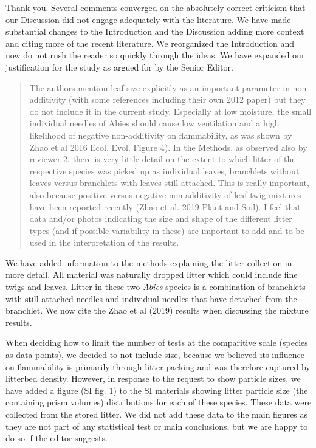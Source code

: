 \documentclass[letterpaper, 12pt]{letter}
\begin{document}
\begin{letter}{}
Thank you. Several comments converged on the absolutely correct criticism that our Discussion did not engage adequately with the literature. We have made substantial changes to the Introduction and the Discussion adding more context and citing more of the recent literature. We reorganized the Introduction and now do not rush the reader so quickly through the ideas. We have expanded our justification for the study as argued for by the Senior Editor.


\begin{quote}
The authors mention leaf size explicitly as an important parameter in non-additivity (with some references including their own 2012 paper) but they do not include it in the current study. Especially at low moisture, the small individual needles of Abies should cause low ventilation and a high likelihood of negative non-additivity on flammability, as was shown by Zhao et al 2016 Ecol. Evol. Figure 4). In the Methods, as observed also by reviewer 2, there is very little detail on the extent to which litter of the respective species was picked up as individual leaves, branchlets without leaves versus branchlets with leaves still attached. This is really important, also because positive versus negative non-additivity of leaf-twig mixtures have been reported recently (Zhao et al. 2019 Plant and Soil). I feel that data and/or photos indicating the size and shape of the different litter types (and if possible variability in these) are important to add and to be used in the interpretation of the results.
\end{quote}

We have added information to the methods explaining the litter collection in
more detail. All material was naturally dropped litter which could include fine
twigs and leaves. Litter in these two \emph{Abies} species is a combination of
branchlets with still attached needles and individual needles that have
detached from the branchlet. We now cite the Zhao et al (2019) results when
discussing the mixture results.

When deciding how to limit the number of tests at the comparitive scale
(species as data points), we decided to not include size, because we believed
its influence on flammability is primarily through litter packing and was
therefore captured by litterbed density. However, in response to the request to
show particle sizes, we have added a figure (SI fig. 1) to the SI materials
showing litter particle size (the containing prism volumes) distributions for
each of these species. These data were collected from the stored litter. We did
not add these data to the main figures as they are not part of any statistical
test or main conclusions, but we are happy to do so if the editor suggests.



\end{letter}
\end{document}
